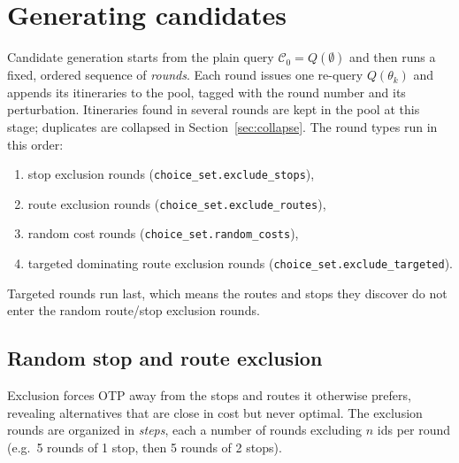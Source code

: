 \documentclass[11pt,a4paper]{article}
\newcommand{\code}[1]{\texttt{#1}}
\newcommand{\cand}{\mathcal{C}}
\begin{document}

\section{Generating candidates}
\label{sec:rounds}

Candidate generation starts from the plain query $\cand_0 = Q(\emptyset)$ and then runs a fixed,
ordered sequence of \emph{rounds}. Each round issues one re-query $Q(\theta_k)$ and appends its
itineraries to the pool, tagged with the round number and its perturbation. Itineraries found in
several rounds are kept in the pool at this stage; duplicates are collapsed in
Section~\ref{sec:collapse}. The round types run in this order:

\begin{enumerate}
  \item stop exclusion rounds (\code{choice\_set.exclude\_stops}),
  \item route exclusion rounds (\code{choice\_set.exclude\_routes}),
  \item random cost rounds (\code{choice\_set.random\_costs}),
  \item targeted dominating route exclusion rounds (\code{choice\_set.exclude\_targeted}).
\end{enumerate}

Targeted rounds run last, which means the routes and stops they discover do not enter the random route/stop exclusion rounds.



\subsection{Random stop and route exclusion}

Exclusion forces OTP away from the stops and routes it otherwise prefers, revealing alternatives that
are close in cost but never optimal. The exclusion rounds are organized in \emph{steps}, each a number
of rounds excluding $n$ ids per round (e.g.\ 5 rounds of 1 stop, then 5 rounds of 2 stops).
\end{document}
